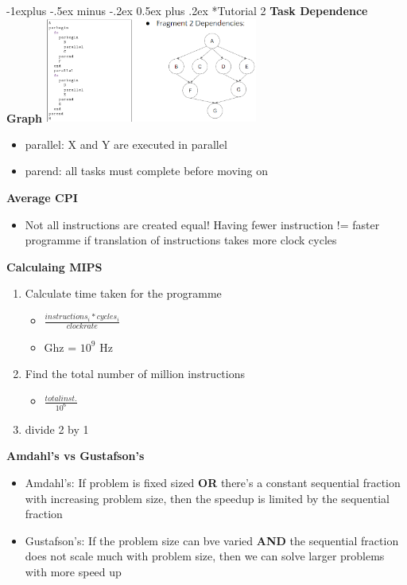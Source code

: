 \documentclass[10pt, landscape]{article}
\makeatletter
\renewcommand{\subsection}{\@startsection{subsection}{2}{0mm}%
                                {-1explus -.5ex minus -.2ex}%
                                {0.5ex plus .2ex}%
                                {\normalfont\normalsize\bfseries}}
\makeatother
\begin{document}
\begin{multicols}{4}
\begin{tabular}{|c|c|c|c|}
\end{tabular}
\label{table:processor_comparison}
    


\subsection*{Tutorial 2}
\textbf{Task Dependence Graph}
\includegraphics*[width=7cm]{task_dependence_graph.png}
\begin{itemize}
    \item parallel: X and Y are executed in parallel 
    \item parend: all tasks must complete before moving on 
\end{itemize}

\textbf{Average CPI}
\begin{itemize}
    \item Not all instructions are created equal! Having fewer instruction != faster programme if translation of instructions takes more clock cycles
\end{itemize}

\textbf{Calculaing MIPS}
\begin{enumerate}
    \item Calculate time taken for the programme
    \begin{itemize}
        \item $\frac{instructions_i * cycles_i}{clock rate}$
        \item Ghz = $10^9$ Hz
    \end{itemize}
    \item Find the total number of million instructions 
    \begin{itemize}
        \item $\frac{total inst.}{10^6}$
    \end{itemize}
    \item divide 2 by 1
\end{enumerate}

\textbf{Amdahl's vs Gustafson's}
\begin{itemize}
    \item Amdahl's: If problem is fixed sized \textbf{OR} there's a constant sequential fraction with increasing problem size, then the speedup is limited by the sequential fraction
    \item Gustafson's: If the problem size can bve varied \textbf{AND} the sequential fraction does not scale much with problem size, then we can solve larger problems with more speed up
\end{itemize}


\end{multicols}
\end{document}
